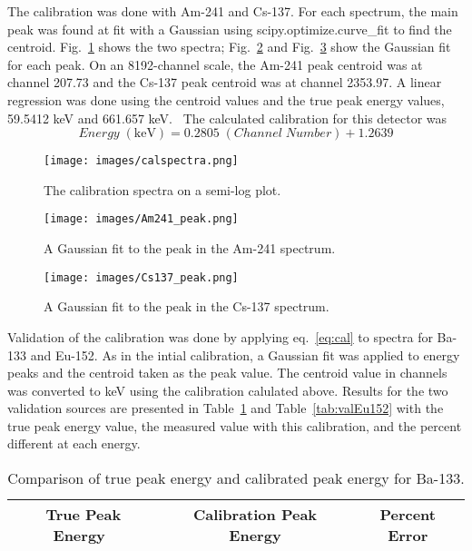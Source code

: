 The calibration was done with Am-241 and Cs-137. For each spectrum, the main peak was found at fit with a Gaussian using scipy.optimize.curve\_fit to find the centroid. Fig.~\ref{fig:calspectra} shows the two spectra; Fig.~\ref{fig:Am241peak} and Fig.~\ref{fig:Cs137peak} show the Gaussian fit for each peak. On an 8192-channel scale, the Am-241 peak centroid was at channel 207.73 and the Cs-137 peak centroid was at channel 2353.97. A linear regression was done using the centroid values and the true peak energy values, 59.5412 keV and 661.657 keV.~\cite{lblndata} The calculated calibration for this detector was
\begin{equation}
  \label{eq:cal} 
  Energy \; \mathrm{ (keV)} = 0.2805 \; (Channel \; Number) + 1.2639 
\end{equation}

\begin{figure}[H]
  \centering
  \label{fig:calspectra} 
  \texttt{[image: images/calspectra.png]} 
  \caption{The calibration spectra on a semi-log plot.} 
\end{figure}
 
\begin{figure}[H]
  \centering
  \label{fig:Am241peak} 
  \texttt{[image: images/Am241\_peak.png]} 
  \caption{A Gaussian fit to the peak in the Am-241 spectrum.} 
\end{figure}

\begin{figure}[H]
  \centering
  \label{fig:Cs137peak} 
  \texttt{[image: images/Cs137\_peak.png]} 
  \caption{A Gaussian fit to the peak in the Cs-137 spectrum.} 
\end{figure}

Validation of the calibration was done by applying eq.~\ref{eq:cal} to spectra for Ba-133 and Eu-152. As in the intial calibration, a Gaussian fit was applied to energy peaks and the centroid taken as the peak value. The centroid value in channels was converted to keV using the calibration calulated above. Results for the two validation sources are presented in Table~\ref{tab:valBa133} and Table~\ref{tab:valEu152} with the true peak energy value, the measured value with this calibration, and the percent different at each energy. 

\begin{table}[H]
  \centering 
  \caption{Comparison of true peak energy and calibrated peak energy for Ba-133.} 
  \begin{tabular}{|ccc|} 
    \hline 
    True Peak Energy~\cite{lblndata} & Calibration Peak Energy & Percent Error \\ 
    \hline 
    
    \hline  
  \end{tabular} 
  \label{tab:valBa133}
\end{table} 

